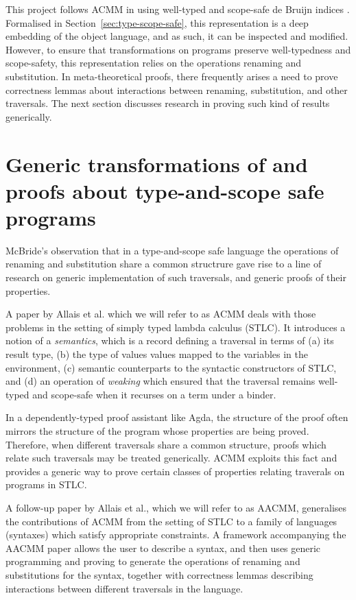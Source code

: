 \documentclass[bsc,frontabs,oneside,singlespacing,parskip,deptreport]{infthesis}
\theoremstyle{definition}
\theoremstyle{lemma}
\begin{document}
This project follows ACMM \cite{DBLP:conf/cpp/Allais0MM17} in using
well-typed and scope-safe de Bruijn indices
\cite{DBLP:conf/csl/AltenkirchR99}. Formalised in
Section~\ref{sec:type-scope-safe}, this representation is a deep
embedding of the object language, and as such, it can be inspected and
modified. However, to ensure that transformations on programs preserve
well-typedness and scope-safety, this representation relies on the
operations renaming and substitution. In meta-theoretical proofs,
there frequently arises a need to prove correctness lemmas about
interactions between renaming, substitution, and other traversals. The
next section discusses research in proving such kind of results
generically.

\section{Generic transformations of and proofs about type-and-scope
  safe programs}
\label{sec:gener-trav-proofs}

McBride's observation \cite{mcbride2005type} that in a type-and-scope
safe language the operations of renaming and substitution share a
common structrure gave rise to a line of research on generic
implementation of such traversals, and generic proofs of their
properties.

A paper by Allais et al. which we will refer to as ACMM
\cite{DBLP:conf/cpp/Allais0MM17} deals with those problems in the
setting of simply typed lambda calculus (STLC). It introduces a notion
of a \textit{semantics}, which is a record defining a traversal in
terms of (a) its result type, (b) the type of values values mapped to
the variables in the environment, (c) semantic counterparts to the
syntactic constructors of STLC, and (d) an operation of
\textit{weaking} which ensured that the traversal remains well-typed
and scope-safe when it recurses on a term under a binder.

In a dependently-typed proof assistant like Agda, the structure of the
proof often mirrors the structure of the program whose properties are
being proved. Therefore, when different traversals share a common
structure, proofs which relate such traversals may be treated
generically. ACMM exploits this fact and provides a generic way to
prove certain classes of properties relating traverals on programs in
STLC.

A follow-up paper by Allais et al., which we will refer to as AACMM,
generalises the contributions of ACMM from the setting of STLC to a
family of languages (syntaxes) which satisfy appropriate
constraints. A framework accompanying the AACMM paper allows the user
to describe a syntax, and then uses generic programming and proving to
generate the operations of renaming and substitutions for the syntax,
together with correctness lemmas describing interactions between
different traversals in the language.
\end{document}
